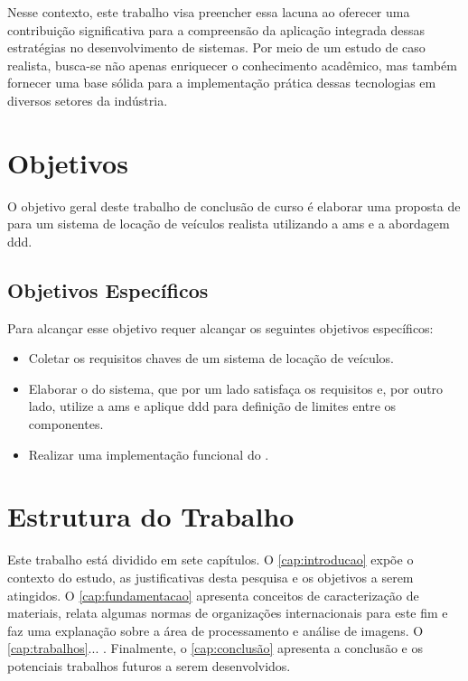 Nesse contexto, este trabalho visa preencher essa lacuna ao oferecer uma contribuição significativa para a compreensão da aplicação integrada dessas estratégias no desenvolvimento de sistemas. Por meio de um estudo de caso realista, busca-se não apenas enriquecer o conhecimento acadêmico, mas também fornecer uma base sólida para a implementação prática dessas tecnologias em diversos setores da indústria.

\section{Objetivos}

O objetivo geral deste trabalho de conclusão de curso é elaborar uma proposta de  para um sistema de locação de veículos realista utilizando a \acrfull{ams} e a abordagem \acrfull{ddd}.

\subsection{Objetivos Específicos}

Para alcançar esse objetivo requer alcançar os seguintes objetivos específicos:
\begin{itemize}
\item Coletar os requisitos chaves de um sistema de locação de veículos.
\item Elaborar o  do sistema, que por um lado satisfaça os requisitos e, por outro lado, utilize a \acrshort{ams} e aplique \acrshort{ddd} para definição de limites entre os componentes.
\item Realizar uma implementação funcional do .
\end{itemize}

\section{Estrutura do Trabalho}

Este trabalho está dividido em sete capítulos.  O \autoref{cap:introducao} expõe o contexto do estudo, as justificativas desta pesquisa e os objetivos a serem atingidos. O \autoref{cap:fundamentacao} apresenta conceitos de caracterização de materiais, relata algumas normas de organizações internacionais para este fim e faz uma explanação sobre a área de processamento e análise de imagens. O \autoref{cap:trabalhos}... . Finalmente, o \autoref{cap:conclusão} apresenta a conclusão e os potenciais trabalhos futuros a serem desenvolvidos.